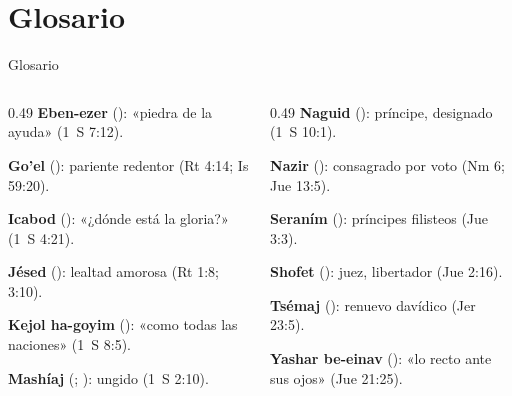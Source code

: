 \section{Glosario}
\begin{frame}{Glosario}
\begin{columns}[t,onlytextwidth]
\begin{column}{0.49\textwidth}\scriptsize
\textbf{Eben-ezer} (): «piedra de la ayuda» (1~S 7:12).\par\smallskip
\textbf{Go'el} (): pariente redentor (Rt 4:14; Is 59:20).\par\smallskip
\textbf{Icabod} (): «¿dónde está la gloria?» (1~S 4:21).\par\smallskip
\textbf{Jésed} (): lealtad amorosa (Rt 1:8; 3:10).\par\smallskip
\textbf{Kejol ha-goyim} (): «como todas las naciones» (1~S 8:5).\par\smallskip
\textbf{Mashíaj} (; ): ungido (1~S 2:10).
\end{column}
\begin{column}{0.49\textwidth}\scriptsize
\textbf{Naguid} (): príncipe, designado (1~S 10:1).\par\smallskip
\textbf{Nazir} (): consagrado por voto (Nm 6; Jue 13:5).\par\smallskip
\textbf{Seraním} (): príncipes filisteos (Jue 3:3).\par\smallskip
\textbf{Shofet} (): juez, libertador (Jue 2:16).\par\smallskip
\textbf{Tsémaj} (): renuevo davídico (Jer 23:5).\par\smallskip
\textbf{Yashar be-einav} (): «lo recto ante sus ojos» (Jue 21:25).
\end{column}
\end{columns}
\end{frame}

